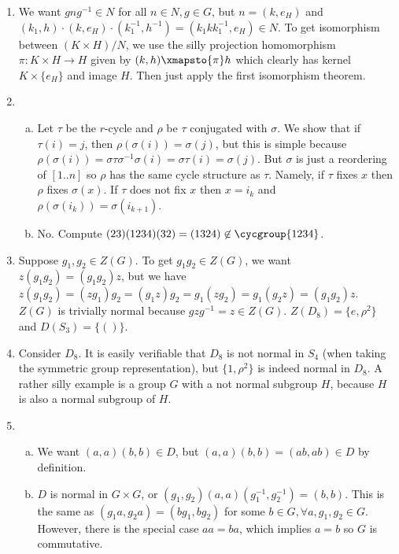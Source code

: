 \documentclass{article}
\begin{document}
\begin{enumerate}

\item We want $gng^{-1} \in N$ for all $n \in N, g \in G$, but $n = (k,
e_H)$ and $(k_1, h) \cdot (k, e_H) \cdot (k_1^{-1}, h^{-1}) = (k_1 k
k_1^{-1}, e_H) \in N$. To get isomorphism between $(K \times H) / N$, we
use the silly projection homomorphism $\pi : K \times H \to H$ given by
$(k, h) \xmapsto{\pi} h$ which clearly has kernel $K \times \lbrace e_H
\rbrace$ and image $H$. Then just apply the first isomorphism theorem.

\item
\begin{enumerate}[(a)]
\item Let $\tau$ be the $r$-cycle and $\rho$ be $\tau$ conjugated with
$\sigma$. We show that if $\tau(i) = j$, then $\rho(\sigma(i)) =
\sigma(j)$, but this is simple because $\rho(\sigma(i)) =
\sigma\tau\sigma^{-1}\sigma(i) = \sigma\tau(i) = \sigma(j)$. But
$\sigma$ is just a reordering of $[1..n]$ so $\rho$ has the same cycle
structure as $\tau$. Namely, if $\tau$ fixes $x$ then $\rho$ fixes
$\sigma(x)$.  If $\tau$ does not fix $x$ then $x = i_k$ and
$\rho(\sigma(i_k)) = \sigma(i_{k + 1})$.

\item No. Compute $(23)(1234)(32) = (1324) \not \in \cycgroup{1234}$.
\end{enumerate}

\item Suppose $g_1, g_2 \in Z(G)$. To get $g_1 g_2 \in Z(G)$, we want
$z(g_1g_2) = (g_1g_2)z$, but we have $z(g_1g_2) = (zg_1)g_2 = (g_1z)g_2
= g_1(zg_2) = g_1(g_2z) = (g_1g_2)z$. $Z(G)$ is trivially normal because
$gzg^{-1} = z \in Z(G)$. $Z(D_8) = \lbrace e, \rho^2 \rbrace$ and
$D(S_3) = \lbrace () \rbrace$.

\item Consider $D_8$. It is easily verifiable that $D_8$ is not normal
in $S_4$ (when taking the symmetric group representation), but $\lbrace
1, \rho^2 \rbrace$ is indeed normal in $D_8$. A rather silly example is
a group $G$ with a not normal subgroup $H$, because $H$ is also a normal
subgroup of $H$.

\item
\begin{enumerate}[(a)]
\item We want $(a, a)(b, b) \in D$, but $(a, a)(b, b) = (ab, ab) \in D$
by definition.
\item $D$ is normal in $G \times G$, or $(g_1, g_2) (a, a) (g_1^{-1},
g_2^{-1}) = (b, b)$. This is the same as $(g_1 a, g_2 a) = (b g_1, b
g_2)$ for some $b \in G, \forall a, g_1, g_2 \in G$. However, there is
the special case $aa = ba$, which implies $a = b$ so $G$ is commutative.
\end{enumerate}

\end{enumerate}
\end{document}
